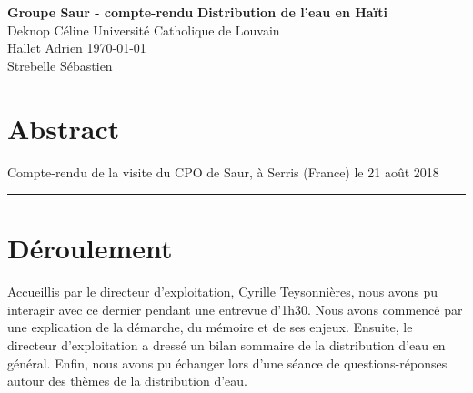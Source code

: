 \documentclass[a4paper, 11pt]{article}
\begin{document}
\noindent
\large\textbf{Groupe Saur - compte-rendu} \hfill \textbf{Distribution de l'eau en Haïti} \\
\normalsize Deknop Céline \hfill Université Catholique de Louvain \\
Hallet Adrien \hfill \today \\
Strebelle Sébastien

\section*{Abstract}
Compte-rendu de la visite du CPO de Saur, à Serris (France) le 21 août 2018
\hrule

\section*{Déroulement}
Accueillis par le directeur d'exploitation, Cyrille Teysonnières, nous avons pu interagir avec ce dernier pendant une entrevue d'1h30. Nous avons commencé par une explication de la démarche, du mémoire et de ses enjeux.
Ensuite, le directeur d'exploitation a dressé un bilan sommaire de la distribution d'eau en général. Enfin, nous avons pu échanger lors d'une séance de questions-réponses autour des thèmes de la distribution d'eau.
\end{document}
